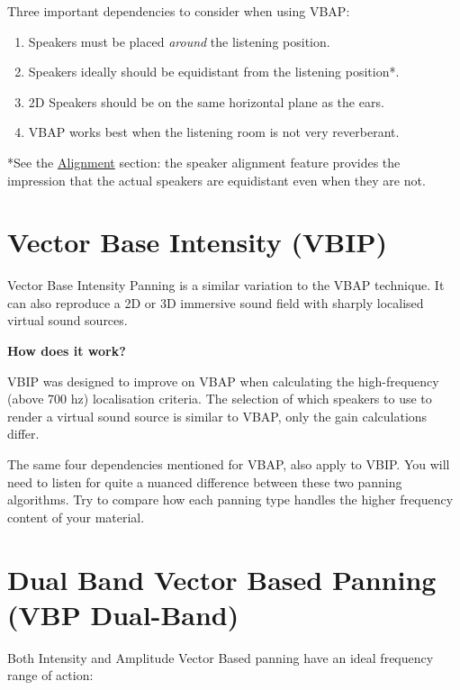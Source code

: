 \documentclass[
  letterpaper,
  DIV=11,
  numbers=noendperiod]{scrreport}
\providecommand{\tightlist}{%
  \setlength{\itemsep}{0pt}\setlength{\parskip}{0pt}}\usepackage{longtable,booktabs,array}
\begin{document}
Three important dependencies to consider when using VBAP:

\begin{enumerate}
\def\labelenumi{\arabic{enumi}.}
\tightlist
\item
  Speakers must be placed \emph{around} the listening position.
\item
  Speakers ideally should be equidistant from the listening position*.
\item
  2D Speakers should be on the same horizontal plane as the ears.
\item
  VBAP works best when the listening room is not very reverberant.
\end{enumerate}

*See the \protect\hyperlink{alignment-section}{Alignment} section: the
speaker alignment feature provides the impression that the actual
speakers are equidistant even when they are not.

\hypertarget{vector-base-intensity-vbip}{%
\section{Vector Base Intensity
(VBIP)}\label{vector-base-intensity-vbip}}

Vector Base Intensity Panning is a similar variation to the VBAP
technique. It can also reproduce a 2D or 3D immersive sound field with
sharply localised virtual sound sources.

\textbf{How does it work?}

VBIP was designed to improve on VBAP when calculating the high-frequency
(above 700 hz) localisation criteria. The selection of which speakers to
use to render a virtual sound source is similar to VBAP, only the gain
calculations differ.

The same four dependencies mentioned for VBAP, also apply to VBIP. You
will need to listen for quite a nuanced difference between these two
panning algorithms. Try to compare how each panning type handles the
higher frequency content of your material.

\hypertarget{dual-band-vector-based-panning-vbp-dual-band}{%
\section{Dual Band Vector Based Panning (VBP
Dual-Band)}\label{dual-band-vector-based-panning-vbp-dual-band}}

Both Intensity and Amplitude Vector Based panning have an ideal
frequency range of action:
\end{document}
